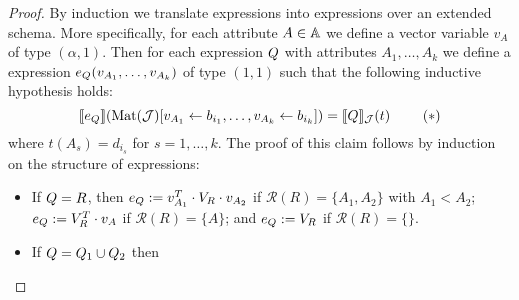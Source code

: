 
\newcommand{\earae}{e_{\arae}}

\begin{proof}	
By induction we translate \rak expressions into \langsum expressions over an extended schema. More specifically, for each attribute $A \in \mathbb{A}$ we define a vector variable $v_A$ of type $(\alpha,1)$. Then for each \rak expression $Q$ with attributes $A_1, \ldots, A_k$ we define a \langsum expression $\earae(v_{A_1}, \ldots, v_{A_k})$ of type $(1,1)$ such that the following inductive hypothesis holds:
$$
\sem{\earae}{\text{Mat}(\cJ)[v_{A_1} \gets b_{i_1},\ldots, v_{A_k} \gets b_{i_k}]} = 
\ssem{\arae}{\cJ}(t) \ \ \ \ \ \ \  (*)
$$
where $t(A_s)=d_{i_s}$ for $s=1,\ldots, k$. The proof of this claim follows by induction on the structure of expressions:
\begin{itemize} \itemsep3mm
	\item If $Q=R$, then $\earae:=v_{A_1}^T \cdot V_R \cdot v_{A_2}$ if $\mathcal{R}(R)=\{A_1,A_2\}$ with $A_1<A_2$; 
	$\earae:=V_R^T \cdot v_A$ if $\mathcal{R}(R)=\{A\}$; and 
	$\earae:=V_R$ if $\mathcal{R}(R)=\{\}$.
	\item If $Q=Q_1\cup Q_2$ then

\end{itemize}
\end{proof}
